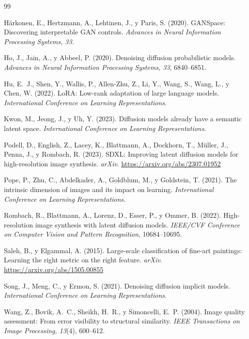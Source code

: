 \documentclass[12pt, a4paper, twoside]{book}
\begin{document}
\begin{thebibliography}{99}

H\"{a}rkonen, E., Hertzmann, A., Lehtinen, J., y Paris, S. (2020).
GANSpace: Discovering interpretable GAN controls.
\textit{Advances in Neural Information Processing Systems, 33}.

Ho, J., Jain, A., y Abbeel, P. (2020).
Denoising diffusion probabilistic models.
\textit{Advances in Neural Information Processing Systems, 33}, 6840--6851.

Hu, E.~J., Shen, Y., Wallis, P., Allen-Zhu, Z., Li, Y., Wang, S., Wang, L., y Chen, W. (2022).
LoRA: Low-rank adaptation of large language models.
\textit{International Conference on Learning Representations}.

Kwon, M., Jeong, J., y Uh, Y. (2023).
Diffusion models already have a semantic latent space.
\textit{International Conference on Learning Representations}.

Podell, D., English, Z., Lacey, K., Blattmann, A., Dockhorn, T., M\"{u}ller, J.,
Penna, J., y Rombach, R. (2023).
SDXL: Improving latent diffusion models for high-resolution image synthesis.
\textit{arXiv}. \url{https://arxiv.org/abs/2307.01952}

Pope, P., Zhu, C., Abdelkader, A., Goldblum, M., y Goldstein, T. (2021).
The intrinsic dimension of images and its impact on learning.
\textit{International Conference on Learning Representations}.

Rombach, R., Blattmann, A., Lorenz, D., Esser, P., y Ommer, B. (2022).
High-resolution image synthesis with latent diffusion models.
\textit{IEEE/CVF Conference on Computer Vision and Pattern Recognition}, 10684--10695.

Saleh, B., y Elgammal, A. (2015).
Large-scale classification of fine-art paintings: Learning the right metric on the right feature.
\textit{arXiv}. \url{https://arxiv.org/abs/1505.00855}

Song, J., Meng, C., y Ermon, S. (2021).
Denoising diffusion implicit models.
\textit{International Conference on Learning Representations}.

Wang, Z., Bovik, A.~C., Sheikh, H.~R., y Simoncelli, E.~P. (2004).
Image quality assessment: From error visibility to structural similarity.
\textit{IEEE Transactions on Image Processing, 13}(4), 600--612.

\end{thebibliography}
\end{document}

